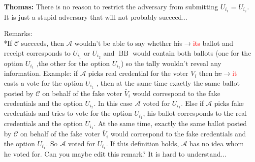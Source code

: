 \documentclass[12pt]{article}
\newcommand{\fix}[2]{\sout{#1}$\rightarrow$\textcolor{red}{#2}}
\DeclareMathOperator{\bb}{BB}
\begin{document}
{\color{red} \textbf{Thomas:} There is no reason to restrict the adversary from submitting $U_{i_1} = U_{i_2}$. It is just a stupid adversary that will not probably succeed...}


Remarks:\\
%
*If  $\mathcal{C}$ succeeds, {\color{red}then} $\mathcal{A}$ wouldn't be able to say whether \fix{his}{its} ballot and receipt corresponds to $U_{i_1}$ or $U_{i_2}$ and $\bb$ would contain both ballots (one for the option $U_{i_1}$ ,the other for the option $ U_{i_2}$) so the tally wouldn't reveal any information. Example: if $\mathcal{A}$  picks real credential for the voter $V_i$ then \fix{he}{it} casts a vote for the option  $U_{i_1}$ , {\color{red}then } at the same time exactly the same ballot posted {\color{red}by} $\mathcal{C}$ on behalf of the fake voter $\tilde{V_i}$ would correspond to the fake credentials and the option $U_{i_2}$. In this case $\mathcal{A}$  voted for $U_{i_1}$. Else if $\mathcal{A}$ picks fake credentials and tries to vote for the option $U_{i_1}$,  his ballot corresponds to the real credentials and  the option $U_{i_1}$. At the same time, exactly the same ballot posted {\color{red}by} $\mathcal{C}$ on behalf of the fake voter $\tilde{V_i}$ would correspond to the fake credentials  and the option $U_{i_1}$. So $\mathcal{A}$  voted for $U_{i_1}$. If this definition holds,  $\mathcal{A}$ has no idea whom he voted for. {\color{red}Can you maybe edit this remark? It is hard to understand...} \\
\end{document}
